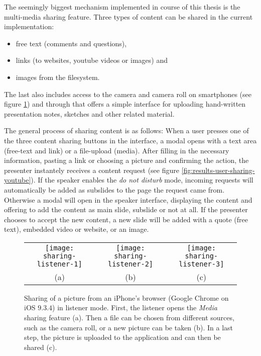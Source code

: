 The seemingly biggest mechanism implemented in course of this thesis is the multi-media sharing feature. Three types of content can be shared in the current implementation:
\begin{itemize}
\item free text (comments and questions),
\item links (to websites, youtube videos or images) and
\item images from the filesystem.
\end{itemize}
The last also includes access to the camera and camera roll on smartphones (see figure \ref{fig:results-user-sharing-picture}) and through that offers a simple interface for uploading hand-written presentation notes, sketches and other related material.

The general process of sharing content is as follows: When a user presses one of the three content sharing buttons in the interface, a modal opens with a text area (free-text and link) or a file-upload (media). After filling in the necessary information, pasting a link or choosing a picture and confirming the action, the presenter instantely receives a content request (see figure \ref{fig:results-user-sharing-youtube}). If the speaker enables the \emph{do not disturb} mode, incoming requests will automatically be added as subslides to the page the request came from. Otherwise a modal will open in the speaker interface, displaying the content and offering to add the content as main slide, subslide or not at all. If the presenter chooses to accept the new content, a new slide will be added with a quote (free text), embedded video or website, or an image.

\begin{figure}
\centering
\begin{tabular}{ccc}
\texttt{[image: sharing-listener-1]} &
\texttt{[image: sharing-listener-2]} &
\texttt{[image: sharing-listener-3]} \\
(a) & (b) & (c)
\end{tabular}
\caption{Sharing of a picture from an iPhone's browser (Google Chrome on iOS $9.3.4$) in listener mode. First, the listener opens the \emph{Media} sharing feature (a). Then a file can be chosen from different sources, such as the camera roll, or a new picture can be taken (b). In a last step, the picture is uploaded to the application and can then be shared (c).}
\label{fig:results-user-sharing-picture}
\end{figure}

